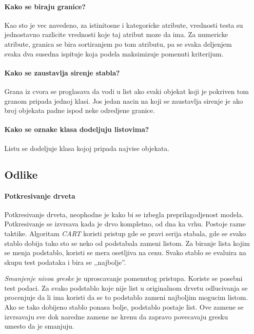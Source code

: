 \documentclass[a4paper]{article}
\begin{document}
\paragraph{Kako se biraju granice?} Kao sto je vec navedeno, za istinitosne i kategoricke atribute,
vrednosti testa su jednostavno razlicite vrednosti koje taj atribut moze da ima. Za numericke
atribute, granica se bira sortiranjem po tom atributu, pa se svaka deljenjem svaka dva susedna
ispituje koja podela maksimizuje pomenuti kriterijum.

\paragraph{Kako se zaustavlja sirenje stabla?} Grana iz cvora se proglasava da vodi u list ako svaki
objekat koji je pokriven tom granom pripada jednoj klasi. Jos jedan nacin na koji se zaustavlja
sirenje je ako broj objekata padne ispod neke odredjene granice.

\paragraph{Kako se oznake klasa dodeljuju listovima?} Listu se dodeljuje klasa kojoj pripada najvise
objekata.

\subsection{Odlike}
\paragraph{Potkresivanje drveta} Potkresivanje drveta, neophodne je kako bi se izbegla
preprilagodjenost modela. Potkresivanje se izvrsava kada je drvo kompletno, od dna ka vrhu. Postoje
razne taktike. Algoritam \emph{CART} koristi pristup gde se pravi serija stabala, gde se svako
stablo dobija tako sto se neko od podstabala zameni listom. Za biranje lista kojim se menja
podstablo, koristi se mera osetljiva na cenu. Svako stablo se evaluira na skupu test podataka i bira
se ,,najbolje''.

\emph{Smanjenje nivoa greske} je uproscavanje pomenutog pristupa. Koriste se posebni test podaci. Za
svako podstablo koje nije list u originalnom drvetu odlucivanja se procenjuje da li ima koristi da
se to podstablo zameni najboljim mogucim listom. Ako se tako dobijeno stablo ponasa bolje, podstablo
postaje list. Ove zamene se izvrsavaju sve dok naredne zamene ne krenu da zapravo povecavaju gresku
umesto da je smanjuju.
\end{document}
